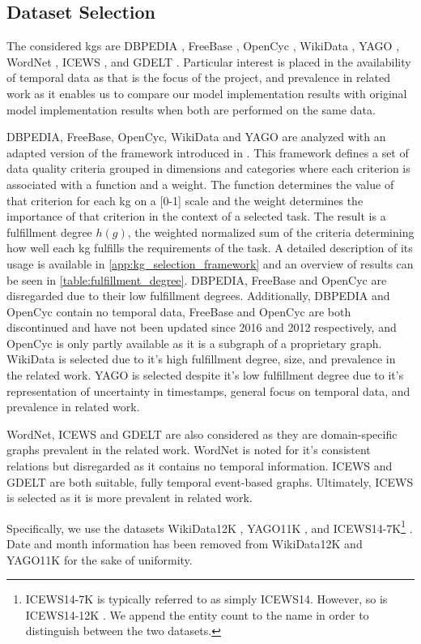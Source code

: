 \subsection{Dataset Selection}
\label{subsec:selection_of_kgs}



The considered \glspl{kg} are DBPEDIA \cite{lehmann2014dbpedia}, FreeBase \cite{bollacker2008freebase}, OpenCyc \cite{2012opencyc, lenat1995cyc}, WikiData \cite{vrandecic2014wikidata}, YAGO \cite{mahdisoltani2015YAGO3, tahon2020YAGO4}, WordNet \cite{miller1995wordnet}, ICEWS \cite{boschee2015ICEWS}, and GDELT \cite{Leetaru2013gdelt, 2023gdelt}.
Particular interest is placed in the availability of temporal data as that is the focus of the project, and prevalence in related work as it enables us to compare our model implementation results with original model implementation results when both are performed on the same data.

DBPEDIA, FreeBase, OpenCyc, WikiData and YAGO are analyzed with an adapted version of the framework introduced in \cite{farber2017dataquality}.
This framework defines a set of data quality criteria grouped in dimensions and categories where each criterion is associated with a function and a weight.
The function determines the value of that criterion for each \gls{kg} on a [0-1] scale and the weight determines the importance of that criterion in the context of a selected task.
The result is a fulfillment degree $h(g)$, the weighted normalized sum of the criteria determining how well each \gls{kg} fulfills the requirements of the task.
A detailed description of its usage is available in \autoref{app:kg_selection_framework} and an overview of results can be seen in \autoref{table:fulfillment_degree}.
DBPEDIA, FreeBase and OpenCyc are disregarded due to their low fulfillment degrees. Additionally, DBPEDIA and OpenCyc contain no temporal data, FreeBase and OpenCyc are both discontinued and have not been updated since 2016 and 2012 respectively, and OpenCyc is only partly available as it is a subgraph of a proprietary graph.
WikiData is selected due to it's high fulfillment degree, size, and prevalence in the related work.
YAGO is selected despite it's low fulfillment degree due to it's representation of uncertainty in timestamps, general focus on temporal data, and prevalence in related work.

WordNet, ICEWS and GDELT are also considered as they are domain-specific graphs prevalent in the related work.
WordNet is noted for it's consistent relations but disregarded as it contains no temporal information.
ICEWS and GDELT are both suitable, fully temporal event-based graphs. Ultimately, ICEWS is selected as it is more prevalent in related work.

Specifically, we use the datasets WikiData12K \cite{dasgupta2018hyte}, YAGO11K \cite{dasgupta2018hyte}, and ICEWS14-7K\footnote{ICEWS14-7K is typically referred to as simply ICEWS14. However, so is ICEWS14-12K \cite{trivedi2017knowevolve}. We append the entity count to the name in order to distinguish between the two datasets.} \cite{garcia-duran2018ta}. Date and month information has been removed from WikiData12K and YAGO11K for the sake of uniformity.